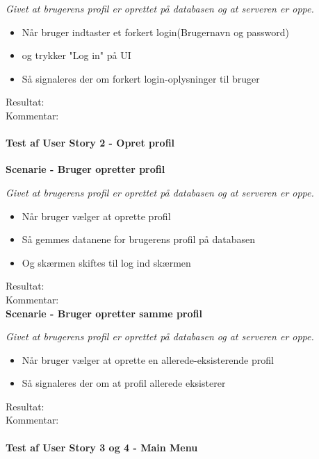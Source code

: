 \textit{Givet at brugerens profil er oprettet på databasen og at serveren er oppe.}

\begin{itemize}
  \item Når bruger indtaster et forkert login(Brugernavn og password)
  \item og trykker "Log in" på UI
  \item Så signaleres der om forkert login-oplysninger til bruger
\end{itemize}

Resultat:\\
Kommentar:\\

\paragraph{Test af User Story 2 - Opret profil}

\textbf{Scenarie - Bruger opretter profil}

\textit{Givet at brugerens profil er oprettet på databasen og at serveren er oppe.}

\begin{itemize}
  \item Når bruger vælger at oprette profil
  \item Så gemmes datanene for brugerens profil på databasen
  \item Og skærmen skiftes til log ind skærmen
\end{itemize}

Resultat:\\
Kommentar:\\

\textbf{Scenarie - Bruger opretter samme profil}

\textit{Givet at brugerens profil er oprettet på databasen og at serveren er oppe.}

\begin{itemize}
  \item Når bruger vælger at oprette en allerede-eksisterende profil
  \item Så signaleres der om at profil allerede eksisterer
\end{itemize}

Resultat:\\
Kommentar:\\

\paragraph{Test af User Story 3 og 4 - Main Menu}

